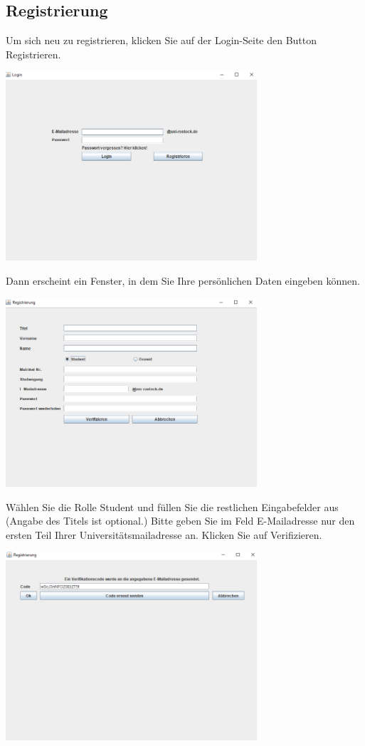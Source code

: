 \documentclass{Handbuch}
\begin{document}
\subsection{Registrierung}
Um sich neu zu registrieren, klicken Sie auf der Login-Seite den Button \frqq Registrieren\flqq{}. 
\begin{center}
	\includegraphics[width=0.7\textwidth]{student00.png}
\end{center}
Dann erscheint ein Fenster, in dem Sie Ihre persönlichen Daten eingeben können. 
\begin{center}
	\includegraphics[width=0.7\textwidth]{student02.png}
\end{center}
Wählen Sie die Rolle \glqq Student\grqq{} und füllen Sie die restlichen Eingabefelder aus (Angabe des Titels ist optional.) Bitte geben Sie im Feld \glqq E-Mailadresse\grqq{} nur den ersten Teil Ihrer Universitätsmailadresse an.
Klicken Sie auf \frqq Verifizieren\flqq. 
\begin{center}
	\includegraphics[width=0.7\textwidth]{img_DozentenGUI_04.png}
\end{center}
\end{document}
